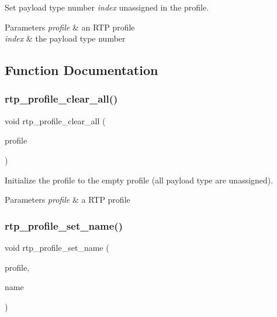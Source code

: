Set payload type number {\itshape index} unassigned in the profile.


\begin{DoxyParams}{Parameters}
{\em profile} & an R\+TP profile \\
\hline
{\em index} & the payload type number \\
\hline
\end{DoxyParams}


\subsection{Function Documentation}
\mbox{\label{rtpprofile_8h_ac8eca5f60a8b9b79ce98b27298d840e8}} 
\subsubsection{rtp\+\_\+profile\+\_\+clear\+\_\+all()}
{\footnotesize\ttfamily void rtp\+\_\+profile\+\_\+clear\+\_\+all (\begin{DoxyParamCaption}\item[{\textbf{ Rtp\+Profile} $\ast$}]{profile }\end{DoxyParamCaption})}

Initialize the profile to the empty profile (all payload type are unassigned). 
\begin{DoxyParams}{Parameters}
{\em profile} & a R\+TP profile \\
\hline
\end{DoxyParams}
\mbox{\label{rtpprofile_8h_ad539a91501c3b3b686b30a6ebc94765c}} 
\subsubsection{rtp\+\_\+profile\+\_\+set\+\_\+name()}
{\footnotesize\ttfamily void rtp\+\_\+profile\+\_\+set\+\_\+name (\begin{DoxyParamCaption}\item[{\textbf{ Rtp\+Profile} $\ast$}]{profile,  }\item[{const char $\ast$}]{name }\end{DoxyParamCaption})}

